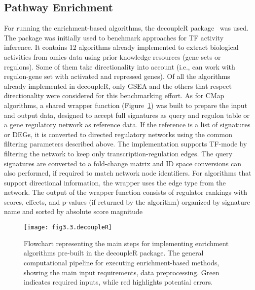 \subsection{Pathway Enrichment} %
\label{sub:pathwayenrichment}

For running the enrichment-based algorithms, the decoupleR package~\cite{RN35} was used. 
The package was initially used to benchmark approaches for \gls{TF} activity inference. 
It contains 12 algorithms already implemented to extract biological activities from omics data using prior knowledge resources (gene sets or regulons). 
Some of them take directionality into account (i.e., can work with regulon-gene set with activated and repressed genes). 
Of all the algorithms already implemented in decoupleR, only \gls{GSEA} and the others that respect directionality were considered for this benchmarking effort. As for \gls{CMap} algorithms, a shared wrapper function (Figure~\ref{fig:fig3.3.decoupleR}) was built to prepare the input and output data, designed to accept full signatures as query and regulon table or a gene regulatory network as reference data. If the reference is a list of signatures or \gls{DEGs}, it is converted to directed regulatory networks using the common filtering parameters described above. 
The implementation supports \gls{TF}-mode by filtering the network to keep only transcription-regulation edges. 
The query signatures are converted to a fold-change matrix and ID space conversions can also performed, if required to match network node identifiers. 
For algorithms that support directional information, the wrapper uses the edge type from the network.
The output of the wrapper function consists of regulator rankings with scores, effects, and p-values (if returned by the algorithm) organized by signature name and sorted by absolute score magnitude

\begin{figure}[htbp]
    \centering
    \texttt{[image: fig3.3.decoupleR]}
    \caption[Flowchart representing the main steps for implementing enrichment algorithms pre-built in the decoupleR package.]{Flowchart representing the main steps for implementing enrichment algorithms pre-built in the decoupleR package. The general computational pipeline for executing enrichment-based methods, showing the main input requirements, data preprocessing. Green indicates required inputs, while red highlights potential errors.}
    \label{fig:fig3.3.decoupleR}
\end{figure}





